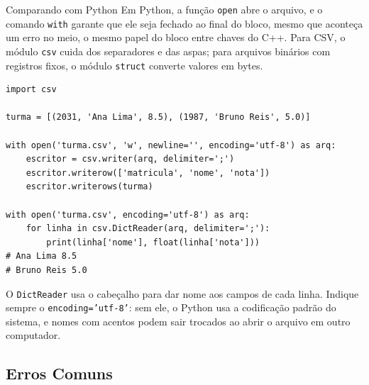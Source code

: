 \begin{destaque}{Comparando com Python}
Em Python, a função \texttt{open} abre o arquivo, e o comando \texttt{with} garante que ele seja fechado ao final do bloco, mesmo que aconteça um erro no meio, o mesmo papel do bloco entre chaves do C++. Para CSV, o módulo \texttt{csv} cuida dos separadores e das aspas; para arquivos binários com registros fixos, o módulo \texttt{struct} converte valores em bytes.

\begin{codigo}
\begin{Verbatim}[breaklines=true, breaksymbolleft={}, fontsize=\footnotesize]
import csv

turma = [(2031, 'Ana Lima', 8.5), (1987, 'Bruno Reis', 5.0)]

with open('turma.csv', 'w', newline='', encoding='utf-8') as arq:
    escritor = csv.writer(arq, delimiter=';')
    escritor.writerow(['matricula', 'nome', 'nota'])
    escritor.writerows(turma)

with open('turma.csv', encoding='utf-8') as arq:
    for linha in csv.DictReader(arq, delimiter=';'):
        print(linha['nome'], float(linha['nota']))
# Ana Lima 8.5
# Bruno Reis 5.0
\end{Verbatim}
\end{codigo}

O \texttt{DictReader} usa o cabeçalho para dar nome aos campos de cada linha. Indique sempre o \texttt{encoding='utf-8'}: sem ele, o Python usa a codificação padrão do sistema, e nomes com acentos podem sair trocados ao abrir o arquivo em outro computador.
\end{destaque}

\subsection{Erros Comuns}

